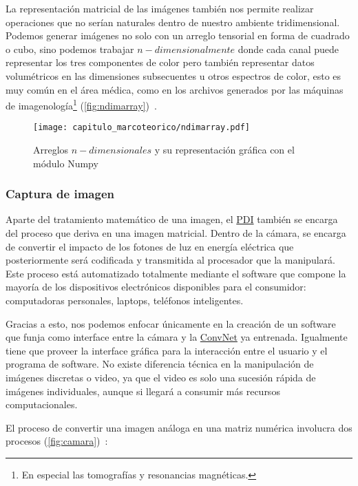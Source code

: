 La representación matricial de las imágenes también nos permite realizar
operaciones que no serían naturales dentro de nuestro ambiente tridimensional.
Podemos generar imágenes no solo con un arreglo tensorial en forma de cuadrado o
cubo, sino podemos trabajar \(n-dimensionalmente\) donde cada canal puede
representar los tres componentes de color pero también representar datos
volumétricos en las dimensiones subsecuentes u otros espectros de color, esto es
muy común en el área médica, como en los archivos generados por las máquinas de
imagenología\footnote{En especial las tomografías y resonancias magnéticas.}
(\autoref{fig:ndimarray})~\cite{Toennies2012}. 

\begin{figure}[H]
    \centering
    \texttt{[image: capitulo\_marcoteorico/ndimarray.pdf]}
    \caption{Arreglos \(n-dimensionales\) y su representación gráfica con el módulo Numpy}\label{fig:ndimarray}
\end{figure}

\subsubsection{Captura de imagen}

Aparte del tratamiento matemático de una imagen, el \hyperlink{abbr}{PDI}
también se encarga del proceso que deriva en una imagen matricial. Dentro de la
cámara, se encarga de convertir el impacto de los fotones de luz en energía
eléctrica que posteriormente será codificada y transmitida al procesador que la
manipulará. Este proceso está automatizado totalmente mediante el software que
compone la mayoría de los dispositivos electrónicos disponibles para el
consumidor: computadoras personales, laptops, teléfonos inteligentes.

Gracias a esto, nos podemos enfocar únicamente en la creación de un software que
funja como interface entre la cámara y la \hyperlink{abbr}{ConvNet} ya
entrenada. Igualmente tiene que proveer la interface gráfica para la interacción
entre el usuario y el programa de software. No existe diferencia técnica en la
manipulación de imágenes discretas o video, ya que el video es solo una sucesión
rápida de imágenes individuales, aunque si llegará a consumir más recursos
computacionales.

El proceso de convertir una imagen análoga en una matriz numérica involucra dos
procesos (\autoref{fig:camara})~\cite{Gries2010}:


